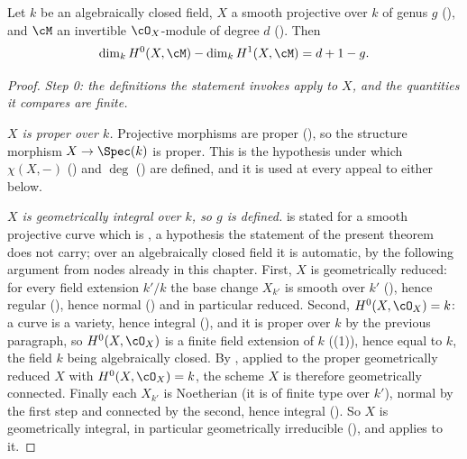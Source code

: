 \begin{theorem}
\label{thm:pc-riemann-roch}
Let $k$ be an algebraically closed field, $X$ a smooth projective
 over $k$ of genus $g$
(), and $\cM$ an invertible $\cO_X$-module of
degree $d$ ().  Then
\[
\dim_kH^0(X,\cM)-\dim_kH^1(X,\cM)=d+1-g .
\]
\leanok
{}
\end{theorem}
\begin{proof}
\emph{Step 0: the definitions the statement invokes apply to $X$, and the
quantities it compares are finite.}

\emph{$X$ is proper over $k$.}  Projective morphisms are proper
(), so the structure morphism
$X\to\Spec(k)$ is proper.  This is the hypothesis under which
$\chi(X,-)$ () and $\deg$
() are defined, and it is used at every
appeal to either below.

\emph{$X$ is geometrically integral over $k$, so $g$ is defined.}
 is stated for a smooth projective curve which is
,
a hypothesis the statement of the present theorem does not carry; over
an algebraically closed field it is automatic, by the following argument
from nodes already in this chapter.  First,
$X$ is geometrically reduced: for every field extension $k'/k$ the base
change $X_{k'}$ is smooth over $k'$ (),
hence regular (), hence normal
() and in particular reduced.  Second,
$H^0(X,\cO_X)=k$: a curve is a variety, hence integral
(), and it is proper over $k$ by the previous
paragraph, so $H^0(X,\cO_X)$ is a finite field extension of $k$
((1)), hence equal to $k$, the field $k$
being algebraically closed.  By , applied
to the proper geometrically reduced $X$ with $H^0(X,\cO_X)=k$, the
scheme $X$ is therefore geometrically connected.  Finally each $X_{k'}$
is Noetherian (it is of finite type over $k'$), normal by the first step
and connected by the second, hence integral
().  So $X$ is
geometrically integral, in particular geometrically irreducible
(), and 
applies to it.


\end{proof}
